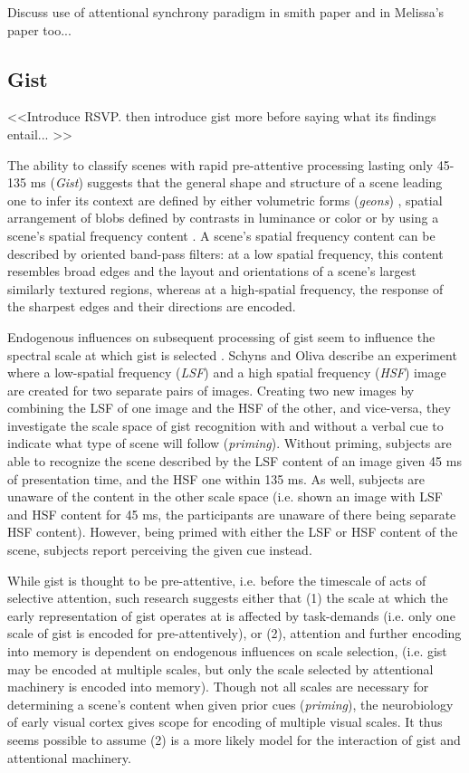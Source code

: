 \documentclass[a4paper,10pt,final]{ThesisStyle}
\begin{document}
Discuss use of attentional synchrony paradigm in smith paper and in Melissa's paper too...

\subsection{Gist}
\label{sec:gist}

<<Introduce RSVP. then introduce gist more before saying what its findings entail... >>

The ability to classify scenes with rapid pre-attentive processing lasting only 45-135 ms (\textit{Gist}) \cite{Potter1969,Biederman1974,Potter1976,Schyns1994,Henderson1999} suggests that the general shape and structure of a scene leading one to infer its context are defined by either volumetric forms (\textit{geons}) \cite{Biederman1987}, spatial arrangement of blobs defined by contrasts in luminance or color \cite{Schyns1994,Oliva1997} or by using a scene's spatial frequency content \cite{Oliva2001,Oliva2005}.  A scene's spatial frequency content can be described by oriented band-pass filters: at a low spatial frequency, this content resembles broad edges and the layout and orientations of a scene's largest similarly textured regions, whereas at a high-spatial frequency, the response of the sharpest edges and their directions are encoded.  

Endogenous influences on subsequent processing of gist seem to influence the spectral scale at which gist is selected \cite{Schyns1994,Oliva1997}.  Schyns and Oliva describe an experiment where a low-spatial frequency (\textit{LSF}) and a high spatial frequency (\textit{HSF}) image are created for two separate pairs of images.  Creating two new images by combining the LSF of one image and the HSF of the other, and vice-versa, they investigate the scale space of gist recognition with and without a verbal cue to indicate what type of scene will follow (\textit{priming}).  Without priming, subjects are able to recognize the scene described by the LSF content of an image given 45 ms of presentation time, and the HSF one within 135 ms.  As well, subjects are unaware of the content in the other scale space (i.e. shown an image with LSF and HSF content for 45 ms, the participants are unaware of there being separate HSF content).  However, being primed with either the LSF or HSF content of the scene, subjects report perceiving the given cue instead.  

While gist is thought to be pre-attentive, i.e. before the timescale of acts of selective attention, such research suggests either that (1) the scale at which the early representation of gist operates at is affected by task-demands (i.e. only one scale of gist is encoded for pre-attentively), or (2), attention and further encoding into memory is dependent on endogenous influences on scale selection, (i.e. gist may be encoded at multiple scales, but only the scale selected by attentional machinery is encoded into memory).  Though not all scales are necessary for determining a scene's content when given prior cues (\textit{priming}), the neurobiology of early visual cortex gives scope for encoding of multiple visual scales.  It thus seems possible to assume (2) is a more likely model for the interaction of gist and attentional machinery.
\end{document}
